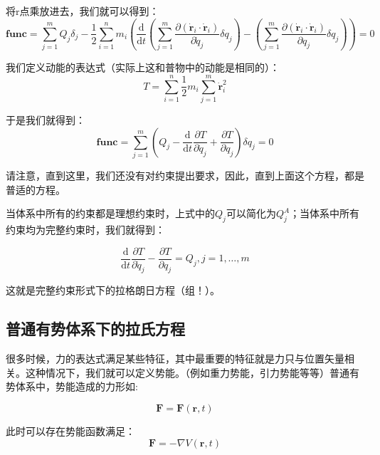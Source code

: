 \documentclass[a4paper, 10pt, openany]{book}%
\begin{document}
    将r点乘放进去，我们就可以得到：
    \begin{equation}
      \textbf{func}=\sum_{j=1}^{m}Q_j\delta_j-\frac{1}{2}\sum_{i=1}^n m_i (\frac{\mathrm{d}}{\mathrm{d}t} (\sum_{j=1}^m \frac{\partial (\dot{\textbf{r}}_i\cdot\dot{\textbf{r}}_i)}{\partial \dot{q}_j}\delta q_j)- (\sum_{j=1}^m \frac{\partial (\dot{\textbf{r}}_i\cdot\dot{\textbf{r}}_i)}{\partial q_j}\delta q_j))=0
    \end{equation}
    
    我们定义动能的表达式（实际上这和普物中的动能是相同的）：
    \begin{equation}
        T=\sum_{i=1}^n \frac{1}{2}m_i\sum_{j=1}^m \dot{\textbf{r}}^2_i
    \end{equation}

    于是我们就得到：
    \begin{equation}
        \textbf{func}=\sum_{j=1}^m \left(Q_j-\frac{\mathrm{d}}{\mathrm{d}t}\frac{\partial T}{\partial \dot{q}_j}+\frac{\partial T}{\partial q_j}\right)\delta q_j=0   
          \end{equation}
    
          请注意，直到这里，我们还没有对约束提出要求，因此，直到上面这个方程，都是普适的方程。
    
          当体系中所有的约束都是理想约束时，上式中的$Q_j$可以简化为$Q_j^A$；当体系中所有约束均为完整约束时，我们就得到：

    \begin{equation}
        \frac{\mathrm{d}}{\mathrm{d}t}\frac{\partial T}{\partial \dot{q}_j}-\frac{\partial T}{\partial q_j}=Q_j,j=1,\dots,m
    \end{equation}

    这就是完整约束形式下的拉格朗日方程（组！）。
    
    \subsection{普通有势体系下的拉氏方程}

    很多时候，力的表达式满足某些特征，其中最重要的特征就是力只与位置矢量相关。这种情况下，我们就可以定义势能。（例如重力势能，引力势能等等）普通有势体系中，势能造成的力形如:

    \begin{equation}\textbf{F}=\textbf{F}(\textbf{r},t)\end{equation}
    
    此时可以存在势能函数满足：
    \begin{equation}\textbf{F}=-\nabla V(\textbf{r},t)\end{equation}
    
\end{document}
